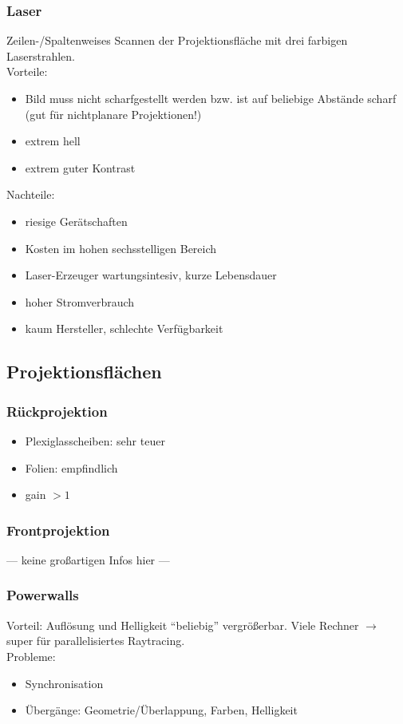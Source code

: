 \documentclass[a4paper, 12pt]{article}
\begin{document}
\subsubsection*{Laser}
Zeilen-/Spaltenweises Scannen der Projektionsfläche mit drei farbigen Laserstrahlen.\\
Vorteile:
\begin{itemize}
  \item Bild muss nicht scharfgestellt werden bzw. ist auf beliebige Abstände scharf (gut für nichtplanare Projektionen!)
  \item extrem hell
  \item extrem guter Kontrast
\end{itemize}
Nachteile:
\begin{itemize}
  \item riesige Gerätschaften
  \item Kosten im hohen sechsstelligen Bereich
  \item Laser-Erzeuger wartungsintesiv, kurze Lebensdauer
  \item hoher Stromverbrauch
  \item kaum Hersteller, schlechte Verfügbarkeit
\end{itemize}


\subsection{Projektionsflächen}

\subsubsection*{Rückprojektion}
\begin{itemize}
  \item Plexiglasscheiben: sehr teuer
  \item Folien: empfindlich
  \item gain \(> 1\)
\end{itemize}

\subsubsection*{Frontprojektion}
--- keine großartigen Infos hier ---

\subsubsection*{Powerwalls}
Vorteil: Auflösung und Helligkeit ``beliebig'' vergrößerbar. Viele Rechner \(\rightarrow\) super für parallelisiertes Raytracing.\\
Probleme:
\begin{itemize}
  \item Synchronisation
  \item Übergänge: Geometrie/Überlappung, Farben, Helligkeit
\end{itemize}
\end{document}
